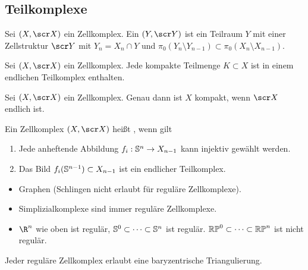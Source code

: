 \subsection{Teilkomplexe}

\begin{df}
    Sei $(X, \scr X)$ ein Zellkomplex.
    Ein  $(Y, \scr Y)$ ist ein Teilraum $Y$ mit einer Zellstruktur $\scr Y$ mit $Y_n = X_n \cap Y$ und $\pi_0(Y_n \setminus Y_{n-1}) \subset \pi_0(X_n \setminus X_{n-1})$.
\end{df}

\begin{st}
    Sei $(X, \scr X)$ ein Zellkomplex.
    Jede kompakte Teilmenge $K \subset X$ ist in einem endlichen Teilkomplex enthalten.
\end{st}

\begin{kor}
    Sei $(X, \scr X)$ ein Zellkomplex.
    Genau dann ist $X$ kompakt, wenn $\scr X$ endlich ist.
\end{kor}

\begin{df}
    Ein Zellkomplex $(X, \scr X)$ heißt , wenn gilt
    \begin{enumerate}[1)]
        \item
            Jede anheftende Abbildung $f_i: \S^n \to X_{n-1}$ kann injektiv gewählt werden.
        \item
            Das Bild $f_i(\S^{n-1}) \subset X_{n-1}$ ist ein endlicher Teilkomplex.
    \end{enumerate}
\end{df}

\begin{ex}
    \begin{itemize}
        \item
            Graphen (Schlingen nicht erlaubt für reguläre Zellkomplexe).
        \item
            Simplizialkomplexe sind immer reguläre Zellkomplexe.
        \item
            $\R^n$ wie oben ist regulär, $\S^0 \subset \dotsb \subset \S^n$ ist regulär.
            $\RP^0 \subset \dotsb \subset \RP^n$ ist nicht regulär.
    \end{itemize}
\end{ex}

\begin{st}
    Jeder reguläre Zellkomplex erlaubt eine baryzentrische Triangulierung.
\end{st}

